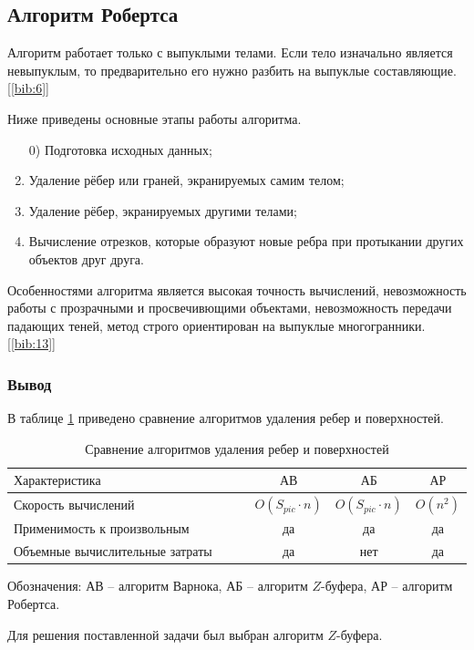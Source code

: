 	\subsection{Алгоритм Робертса}
	\par Алгоритм работает только с выпуклыми телами. Если тело изначально является невыпуклым, то предварительно его нужно разбить на выпуклые составляющие. [\ref{bib:6}]
	\par Ниже приведены основные этапы работы алгоритма.
	\begin{enumerate}
		\item[0)] Подготовка исходных данных;
		\item Удаление рёбер или граней, экранируемых самим телом;
		\item Удаление рёбер, экранируемых другими телами;
		\item Вычисление отрезков, которые образуют новые ребра при протыкании других объектов друг друга.
	\end{enumerate}
	\par Особенностями алгоритма является высокая точность вычислений, невозможность работы с прозрачными и просвечивющими объектами, невозможность передачи падающих теней, метод строго ориентирован на выпуклые многогранники. [\ref{bib:13}]
	\subsubsection*{Вывод}

	\par В таблице \ref{table:OtrCompare} приведено сравнение алгоритмов удаления ребер и поверхностей.

	 \begin{table}[h!]
            \caption{Сравнение алгоритмов удаления ребер и поверхностей}
            \centering
            \begin{tabular}{|l|c|c|c|}
            \hline
            $\text{Характеристика}$ & $\text{АВ}$ & $\text{АБ}$ & $\text{АР}$\\ \hline
            $\text{Скорость вычислений}$ & \begin{math} O(S_{pic}\cdot n) \end{math} & \begin{math} O(S_{pic}\cdot n) \end{math} & \begin{math} O(n^2)\end{math}\\ \hline
            $\text{Применимость к произвольным выпуклым объектам}$ & да & да & да\\ \hline
            $\text{Объемные вычислительные затраты}$ & да & нет & да\\ \hline
            \end{tabular}
            \label{table:OtrCompare}
    \end{table}
    \par Обозначения: АВ -- алгоритм Варнока, АБ -- алгоритм $Z$-буфера, АР -- алгоритм Робертса.
    \par Для решения поставленной задачи был выбран алгоритм $Z$-буфера.

